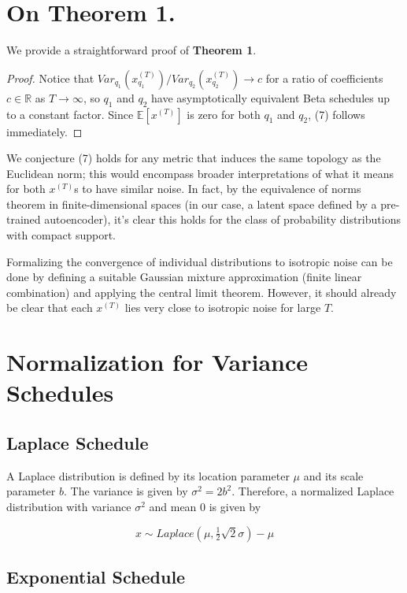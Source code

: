 \documentclass[10pt,twocolumn,letterpaper]{article}
\begin{document}
\section{On Theorem 1.}
We provide a straightforward proof of \textbf{Theorem 1}.
\begin{proof}
    Notice that $Var_{q_1}(x_{q_1}^{(T)})/Var_{q_2}(x_{q_2}^{(T)})\to c$ for a ratio of coefficients $c\in \mathbb{R}$ as $T\to \infty$, so $q_1$ and $q_2$ have asymptotically equivalent Beta schedules up to a constant factor. Since $\mathbb{E}[x^{(T)}]$ is zero for both $q_1$ and $q_2$, (7) follows immediately.
\end{proof}
We conjecture (7) holds for any metric that induces the same topology as the Euclidean norm; this would encompass broader interpretations of what it means for both $x^{(T)}$s to have similar noise. In fact, by the equivalence of norms theorem in finite-dimensional spaces (in our case, a latent space defined by a pre-trained autoencoder), it's clear this holds for the class of probability distributions with compact support.

Formalizing the convergence of individual distributions to isotropic noise can be done by defining a suitable Gaussian mixture approximation (finite linear combination) and applying the central limit theorem. However, it should already be clear that each $x^{(T)}$ lies very close to isotropic noise for large $T$.

\section{Normalization for Variance Schedules}

\subsection{Laplace Schedule}

A Laplace distribution is defined by its location parameter $\mu$ and its scale parameter $b$. The variance is given by $\sigma^2 = 2b^2$. Therefore, a normalized Laplace distribution with variance $\sigma^2$ and mean 0 is given by


\begin{equation}x \sim \textit{Laplace}(\mu,\tfrac{1}{2}\sqrt{2}\sigma) - \mu
\end{equation}

\subsection{Exponential Schedule}
\end{document}
